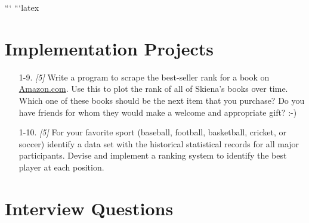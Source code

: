 \documentclass[10pt]{article}
\begin{document}
```
```latex
\section*{Implementation Projects}

\begin{enumerate}
    \item[1-9.] \textit{[5]} Write a program to scrape the best-seller rank for a book on \href{http://Amazon.com}{Amazon.com}. Use this to plot the rank of all of Skiena’s books over time. Which one of these books should be the next item that you purchase? Do you have friends for whom they would make a welcome and appropriate gift? :-)

    \item[1-10.] \textit{[5]} For your favorite sport (baseball, football, basketball, cricket, or soccer) identify a data set with the historical statistical records for all major participants. Devise and implement a ranking system to identify the best player at each position.
\end{enumerate}

\section*{Interview Questions}
\end{document}
